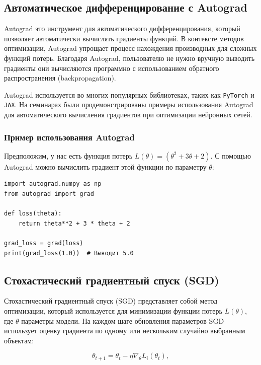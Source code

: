 \subsection{Автоматическое дифференцирование с Autograd}

Autograd \textendash{} это инструмент для автоматического дифференцирования, который позволяет автоматически вычислять градиенты функций. В контексте методов оптимизации, Autograd упрощает процесс нахождения производных для сложных функций потерь. Благодаря Autograd, пользователю не нужно вручную выводить градиенты \textendash{} они вычисляются программно с использованием обратного распространения (backpropagation).

Autograd используется во многих популярных библиотеках, таких как \texttt{PyTorch} и \texttt{JAX}. На семинарах были продемонстрированы примеры использования Autograd для автоматического вычисления градиентов при оптимизации нейронных сетей.

\subsubsection{Пример использования Autograd}

Предположим, у нас есть функция потерь $L(\theta) = (\theta^2 + 3\theta + 2)$. С помощью Autograd можно вычислить градиент этой функции по параметру $\theta$:

\begin{verbatim}
import autograd.numpy as np
from autograd import grad

def loss(theta):
    return theta**2 + 3 * theta + 2

grad_loss = grad(loss)
print(grad_loss(1.0))  # Выводит 5.0
\end{verbatim}

\subsection{Стохастический градиентный спуск (SGD)}

Стохастический градиентный спуск (SGD) представляет собой метод оптимизации, который используется для минимизации функции потерь $L(\theta)$, где $\theta$ \textendash{} параметры модели. На каждом шаге обновления параметров SGD использует оценку градиента по одному или нескольким случайно выбранным объектам:

\begin{equation}
\theta_{t+1} = \theta_t - \eta \nabla_\theta L_i(\theta_t),
\end{equation}

